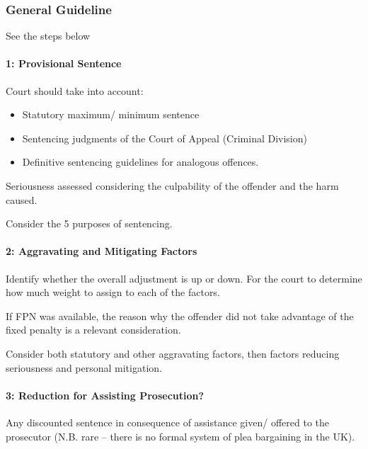 \documentclass[
]{article}
\providecommand{\tightlist}{%
  \setlength{\itemsep}{0pt}\setlength{\parskip}{0pt}}
\begin{document}
\hypertarget{general-guideline}{%
\subsubsection{General Guideline}\label{general-guideline}}

See the steps below

\hypertarget{provisional-sentence}{%
\paragraph{1: Provisional Sentence}\label{provisional-sentence}}

Court should take into account:

\begin{itemize}
\tightlist
\item
  Statutory maximum/ minimum sentence
\item
  Sentencing judgments of the Court of Appeal (Criminal Division)
\item
  Definitive sentencing guidelines for analogous offences.
\end{itemize}

Seriousness assessed considering the culpability of the offender and the
harm caused.

Consider the 5 purposes of sentencing.

\hypertarget{aggravating-and-mitigating-factors}{%
\paragraph{2: Aggravating and Mitigating
Factors}\label{aggravating-and-mitigating-factors}}

Identify whether the overall adjustment is up or down. For the court to
determine how much weight to assign to each of the factors.

If FPN was available, the reason why the offender did not take advantage
of the fixed penalty is a relevant consideration.

Consider both statutory and other aggravating factors, then factors
reducing seriousness and personal mitigation.

\hypertarget{reduction-for-assisting-prosecution}{%
\paragraph{3: Reduction for Assisting
Prosecution?}\label{reduction-for-assisting-prosecution}}

Any discounted sentence in consequence of assistance given/ offered to
the prosecutor (N.B. rare -- there is no formal system of plea
bargaining in the UK).
\end{document}
